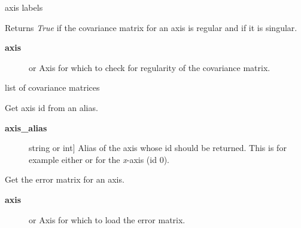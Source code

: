 \documentclass[a4paper,10pt,english]{sphinxmanual}
\begin{document}
\begin{fulllineitems}
\begin{fulllineitems}
\label{index:kafe.dataset.Dataset.axis_labels}
axis labels

\end{fulllineitems}


\begin{fulllineitems}
\label{index:kafe.dataset.Dataset.cov_mat_is_regular}
Returns \emph{True} if the covariance matrix for an axis is regular and
 if it is singular.
\begin{description}
\item[{\textbf{axis}}] \leavevmode{[} or \code{'y'}{]}
Axis for which to check for regularity of the covariance matrix.

\end{description}

\end{fulllineitems}


\begin{fulllineitems}
\label{index:kafe.dataset.Dataset.cov_mats}
list of covariance matrices

\end{fulllineitems}


\begin{fulllineitems}
\label{index:kafe.dataset.Dataset.get_axis}
Get axis id from an alias.
\begin{description}
\item[{\textbf{axis\_alias}}] \leavevmode{[}string or int{]}
Alias of the axis whose id should be returned. This is for example
either  or  for the \emph{x}-axis (id 0).

\end{description}

\end{fulllineitems}


\begin{fulllineitems}
\label{index:kafe.dataset.Dataset.get_cov_mat}
Get the error matrix for an axis.
\begin{description}
\item[{\textbf{axis}}] \leavevmode{[} or \code{'y'}{]}
Axis for which to load the error matrix.


\end{description}
\end{fulllineitems}
\end{fulllineitems}
\end{document}
